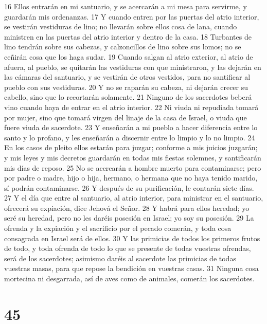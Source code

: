16 Ellos entrarán en mi santuario, y se acercarán a mi mesa para servirme, y guardarán mis ordenanzas.
17 Y cuando entren por las puertas del atrio interior, se vestirán vestiduras de lino; no llevarán sobre ellos cosa de lana, cuando ministren en las puertas del atrio interior y dentro de la casa.
18 Turbantes de lino tendrán sobre sus cabezas, y calzoncillos de lino sobre sus lomos; no se ceñirán cosa que los haga sudar.
19 Cuando salgan al atrio exterior, al atrio de afuera, al pueblo, se quitarán las vestiduras con que ministraron, y las dejarán en las cámaras del santuario, y se vestirán de otros vestidos, para no santificar al pueblo con sus vestiduras.
20 Y no se raparán su cabeza, ni dejarán crecer su cabello, sino que lo recortarán solamente.
21 Ninguno de los sacerdotes beberá vino cuando haya de entrar en el atrio interior. 
22 Ni viuda ni repudiada tomará por mujer, sino que tomará virgen del linaje de la casa de Israel, o viuda que fuere viuda de sacerdote. 
23 Y enseñarán a mi pueblo a hacer diferencia entre lo santo y lo profano, y les enseñarán a discernir entre lo limpio y lo no limpio. 
24 En los casos de pleito ellos estarán para juzgar; conforme a mis juicios juzgarán; y mis leyes y mis decretos guardarán en todas mis fiestas solemnes, y santificarán mis días de reposo.
25 No se acercarán a hombre muerto para contaminarse; pero por padre o madre, hijo o hija, hermano, o hermana que no haya tenido marido, sí podrán contaminarse.
26 Y después de su purificación, le contarán siete días.
27 Y el día que entre al santuario, al atrio interior, para ministrar en el santuario, ofrecerá su expiación, dice Jehová el Señor.
28 Y habrá para ellos heredad; yo seré su heredad, pero no les daréis posesión en Israel; yo soy su posesión.
29 La ofrenda y la expiación y el sacrificio por el pecado comerán, y toda cosa consagrada en Israel será de ellos.
30 Y las primicias de todos los primeros frutos de todo, y toda ofrenda de todo lo que se presente de todas vuestras ofrendas, será de los sacerdotes; asimismo daréis al sacerdote las primicias de todas vuestras masas, para que repose la bendición en vuestras casas. 
31 Ninguna cosa mortecina ni desgarrada, así de aves como de animales, comerán los sacerdotes. 

\chapter{45}


